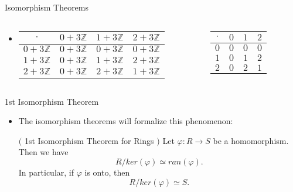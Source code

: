 \documentclass[ %
 10pt, xcolor={dvipsnames,svgnames,x11names,hyperref},
   hyperref={colorlinks=true,citecolor=green,linkcolor=DarkRed,urlcolor=ProcessBlue,anchorcolor=blue}
  ]{beamer}
\newenvironment{stepitemize}{\begin{itemize}[<+->]}{\end{itemize} }
\newcommand{\Z}{\mathbb{Z}}
\begin{document}
\begin{frame}{Isomorphism Theorems}
\begin{stepitemize}
\item[]    
\begin{columns}
        \begin{column}{0.4\textwidth}
     \begin{table}
\begin{tabular}{ c| c | c | c}
$\cdot$  & {\color{blue} $0+3\Z$} & {\color{red} $1+3\Z$} & {\color{teal}$2+3\Z$} \\
\hline
{\color{blue} $0+3\Z$} & {\color{blue} $0+3\Z$} & {\color{blue} $0+3\Z$} & {\color{blue} $0+3\Z$}  \\ 
\hline
{\color{red} $1+3\Z$} & {\color{blue}$0+3\Z$} & {\color{red} $1+3\Z$} & {\color{teal}$2+3\Z$}  \\ 
\hline
{\color{teal} $2+3\Z$} & {\color{blue} $0+3\Z$} & {\color{teal}$2+3\Z$} & {\color{red} $1+3\Z$} \\ 
\hline
\end{tabular}
\end{table}
    \end{column}
    
        \begin{column}{0.4\textwidth}
    \begin{table}
\begin{tabular}{ c| c | c | c}
$\cdot$ & {\color{blue} $0$}& {\color{red} $1$} & {\color{teal} $2$} \\
\hline
{\color{blue} $0$} & {\color{blue}$0$} & {\color{blue}$0$} & {\color{blue}$0$}  \\ 
\hline
{\color{red} $1$} & {\color{blue} $0$} & {\color{red} $1$} & {\color{teal} $2$}  \\ 
\hline
{\color{teal} $2$} & {\color{blue} $0$} & {\color{teal} $2$} & {\color{red} $1$} \\ 
\hline
\end{tabular}
\end{table}
    \end{column}
\end{columns}
    
\end{stepitemize}
\end{frame}

\begin{frame}{1st Isomorphism Theorem}
    \begin{stepitemize}
        \item The isomorphism theorems will formalize this phenomenon:
\begin{theorem}$($ 1st Isomorphism Theorem for Rings $)$
Let $\varphi: R\rightarrow S$ be a homomorphism. Then we have
$$R/ker(\varphi) \simeq ran(\varphi).$$
In particular, if $\varphi$ is onto, then 
$$R/ker(\varphi) \simeq S. $$
\end{theorem}
    \end{stepitemize}
\end{frame}
\end{document}
